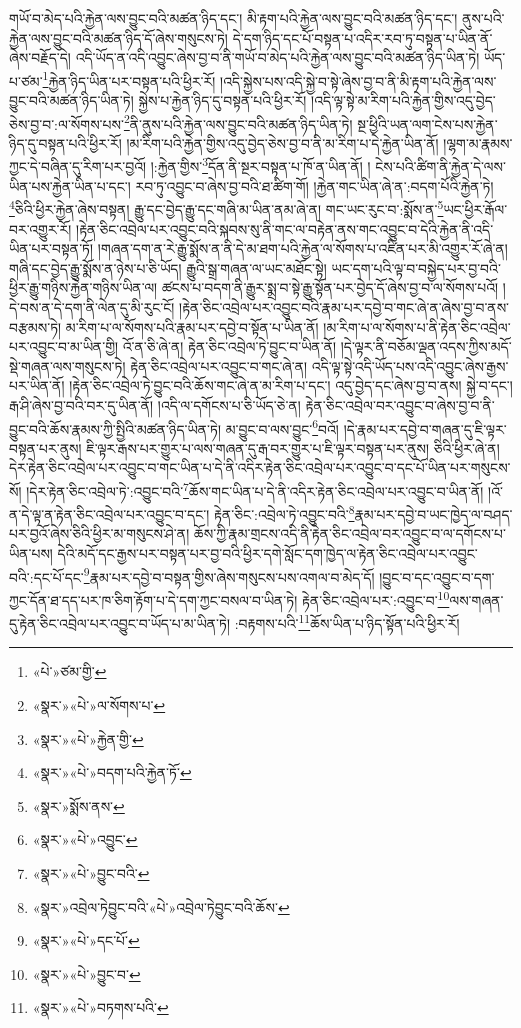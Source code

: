 གཡོ་བ་མེད་པའི་རྐྱེན་ལས་བྱུང་བའི་མཚན་ཉིད་དང་། མི་རྟག་པའི་རྐྱེན་ལས་བྱུང་བའི་མཚན་ཉིད་དང་། ནུས་པའི་རྐྱེན་ལས་བྱུང་བའི་མཚན་ཉིད་དོ་ཞེས་གསུངས་ཏེ། དེ་དག་ཉིད་དང་པོ་བསྟན་པ་འདིར་རབ་ཏུ་བསྟན་པ་ཡིན་ནོ་ཞེས་བརྗོད་དེ། འདི་ཡོད་ན་འདི་འབྱུང་ཞེས་བྱ་བ་ནི་གཡོ་བ་མེད་པའི་རྐྱེན་ལས་བྱུང་བའི་མཚན་ཉིད་ཡིན་ཏེ། ཡོད་པ་ཙམ་\footnote{«པེ་»ཙམ་གྱི་}རྐྱེན་ཉིད་ཡིན་པར་བསྟན་པའི་ཕྱིར་རོ། །འདི་སྐྱེས་པས་འདི་སྐྱེ་བ་སྟེ་ཞེས་བྱ་བ་ནི་མི་རྟག་པའི་རྐྱེན་ལས་བྱུང་བའི་མཚན་ཉིད་ཡིན་ཏེ། སྐྱེས་པ་རྐྱེན་ཉིད་དུ་བསྟན་པའི་ཕྱིར་རོ། །འདི་ལྟ་སྟེ་མ་རིག་པའི་རྐྱེན་གྱིས་འདུ་བྱེད་ཅེས་བྱ་བ་:ལ་སོགས་པས་\footnote{«སྣར་»«པེ་»ལ་སོགས་པ་}ནི་ནུས་པའི་རྐྱེན་ལས་བྱུང་བའི་མཚན་ཉིད་ཡིན་ཏེ། སྔ་ཕྱིའི་ཡན་ལག་ངེས་པས་རྐྱེན་ཉིད་དུ་བསྟན་པའི་ཕྱིར་རོ། །མ་རིག་པའི་རྐྱེན་གྱིས་འདུ་བྱེད་ཅེས་བྱ་བ་ནི་མ་རིག་པ་དེ་རྐྱེན་ཡིན་ནོ། །ལྷག་མ་རྣམས་ཀྱང་དེ་བཞིན་དུ་རིག་པར་བྱའོ། །:རྐྱེན་གྱིས་\footnote{«སྣར་»«པེ་»རྐྱེན་གྱི་}དོན་ནི་སྔར་བསྟན་པ་ཁོ་ན་ཡིན་ནོ། །
ངེས་པའི་ཚིག་ནི་རྐྱེན་དེ་ལས་ཡིན་པས་རྐྱེན་ཡིན་པ་དང་། རབ་ཏུ་འབྱུང་བ་ཞེས་བྱ་བའི་ཐ་ཚིག་གོ། །རྐྱེན་གང་ཡིན་ཞེ་ན་:བདག་པོའི་རྐྱེན་ཏེ། \footnote{«སྣར་»«པེ་»བདག་པའི་རྐྱེན་ཏོ་}ཅིའི་ཕྱིར་རྐྱེན་ཞེས་བསྟན། རྒྱུ་དང་བྱེད་རྒྱུ་དང་གཞི་མ་ཡིན་ནམ་ཞེ་ན། གང་ཡང་རུང་བ་:སྨོས་ན་\footnote{«སྣར་»སྨོས་ནས་}ཡང་ཕྱིར་རྒོལ་བར་འགྱུར་རོ། །རྟེན་ཅིང་འབྲེལ་པར་འབྱུང་བའི་སྐབས་སུ་ནི་གང་ལ་བརྟེན་ནས་གང་འབྱུང་བ་དེའི་རྐྱེན་ནི་འདི་ཡིན་པར་བསྟན་ཏོ། །གཞན་དག་ན་རེ་རྒྱུ་སྨོས་ན་ནི་དེ་མ་ཐག་པའི་རྐྱེན་ལ་སོགས་པ་འཛིན་པར་མི་འགྱུར་རོ་ཞེ་ན། གཞི་དང་བྱེད་རྒྱུ་སྨོས་ན་ཉེས་པ་ཅི་ཡོད། རྒྱུའི་སྒྲ་གཞན་ལ་ཡང་མཐོང་སྟེ། ཡང་དག་པའི་ལྟ་བ་བསྐྱེད་པར་བྱ་བའི་ཕྱིར་རྒྱུ་གཉིས་རྐྱེན་གཉིས་ཡིན་ལ། ཚངས་པ་བདག་ནི་རྒྱུར་སྨྲ་བ་སྟེ་རྒྱུ་སྟོན་པར་བྱེད་དོ་ཞེས་བྱ་བ་ལ་སོགས་པའོ། །དེ་བས་ན་དེ་དག་ནི་ལེན་དུ་མི་རུང་ངོ། །རྟེན་ཅིང་འབྲེལ་པར་འབྱུང་བའི་རྣམ་པར་དབྱེ་བ་གང་ཞེ་ན་ཞེས་བྱ་བ་ནས་བརྩམས་ཏེ། མ་རིག་པ་ལ་སོགས་པའི་རྣམ་པར་དབྱེ་བ་སྟོན་པ་ཡིན་ནོ། །མ་རིག་པ་ལ་སོགས་པ་ནི་རྟེན་ཅིང་འབྲེལ་པར་འབྱུང་བ་མ་ཡིན་གྱི། འོ་ན་ཅི་ཞེ་ན། རྟེན་ཅིང་འབྲེལ་ཏེ་བྱུང་བ་ཡིན་ནོ། །དེ་ལྟར་ནི་བཅོམ་ལྡན་འདས་ཀྱིས་མདོ་སྡེ་གཞན་ལས་གསུངས་ཏེ། རྟེན་ཅིང་འབྲེལ་པར་འབྱུང་བ་གང་ཞེ་ན། འདི་ལྟ་སྟེ་འདི་ཡོད་པས་འདི་འབྱུང་ཞེས་རྒྱས་པར་ཡིན་ནོ། །རྟེན་ཅིང་འབྲེལ་ཏེ་བྱུང་བའི་ཆོས་གང་ཞེ་ན་མ་རིག་པ་དང་། འདུ་བྱེད་དང་ཞེས་བྱ་བ་ནས། སྐྱེ་བ་དང་། རྒ་ཤི་ཞེས་བྱ་བའི་བར་དུ་ཡིན་ནོ། །འདི་ལ་དགོངས་པ་ཅི་ཡོད་ཅེ་ན། རྟེན་ཅིང་འབྲེལ་བར་འབྱུང་བ་ཞེས་བྱ་བ་ནི་བྱུང་བའི་ཆོས་རྣམས་ཀྱི་སྤྱིའི་མཚན་ཉིད་ཡིན་ཏེ། མ་བྱུང་བ་ལས་བྱུང་\footnote{«སྣར་»«པེ་»འབྱུང་}བའོ། །དེ་རྣམ་པར་དབྱེ་བ་གཞན་དུ་ཇི་ལྟར་བསྟན་པར་ནུས། ཇི་ལྟར་རྒས་པར་གྱུར་པ་ལས་གཞན་དུ་རྒ་བར་གྱུར་པ་ཇི་ལྟར་བསྟན་པར་ནུས། ཅིའི་ཕྱིར་ཞེ་ན། དེར་རྟེན་ཅིང་འབྲེལ་པར་འབྱུང་བ་གང་ཡིན་པ་དེ་ནི་འདིར་རྟེན་ཅིང་འབྲེལ་པར་འབྱུང་བ་དང་པོ་ཡིན་པར་གསུངས་སོ། །དེར་རྟེན་ཅིང་འབྲེལ་ཏེ་:འབྱུང་བའི་\footnote{«སྣར་»«པེ་»བྱུང་བའི་}ཆོས་གང་ཡིན་པ་དེ་ནི་འདིར་རྟེན་ཅིང་འབྲེལ་པར་འབྱུང་བ་ཡིན་ནོ། །འོ་ན་དེ་ལྟ་ན་རྟེན་ཅིང་འབྲེལ་པར་འབྱུང་བ་དང་། རྟེན་ཅིང་:འབྲེལ་ཏེ་འབྱུང་བའི་\footnote{«སྣར་»འབྲེལ་ཏེབྱུང་བའི་«པེ་»འབྲེལ་ཏེབྱུང་བའི་ཆོས་}རྣམ་པར་དབྱེ་བ་ཡང་ཁྱེད་ལ་བཤད་པར་བྱའོ་ཞེས་ཅིའི་ཕྱིར་མ་གསུངས་ཤེ་ན། ཆོས་ཀྱི་རྣམ་གྲངས་འདི་ནི་རྟེན་ཅིང་འབྲེལ་བར་འབྱུང་བ་ལ་དགོངས་པ་ཡིན་པས། དེའི་མདོ་དང་རྒྱས་པར་བསྟན་པར་བྱ་བའི་ཕྱིར་དགེ་སློང་དག་ཁྱེད་ལ་རྟེན་ཅིང་འབྲེལ་པར་འབྱུང་བའི་:དང་པོ་དང་\footnote{«སྣར་»«པེ་»དང་པོ་}རྣམ་པར་དབྱེ་བ་བསྟན་གྱིས་ཞེས་གསུངས་པས་འགལ་བ་མེད་དོ། །བྱུང་བ་དང་འབྱུང་བ་དག་ཀྱང་དོན་ཐ་དད་པར་ཁ་ཅིག་རྟོག་པ་དེ་དག་ཀྱང་བསལ་བ་ཡིན་ཏེ། རྟེན་ཅིང་འབྲེལ་པར་:འབྱུང་བ་\footnote{«སྣར་»«པེ་»བྱུང་བ་}ལས་གཞན་དུ་རྟེན་ཅིང་འབྲེལ་པར་འབྱུང་བ་ཡོད་པ་མ་ཡིན་ཏེ། :བརྟགས་པའི་\footnote{«སྣར་»«པེ་»བཏགས་པའི་}ཆོས་ཡིན་པ་ཉིད་སྟོན་པའི་ཕྱིར་རོ། 